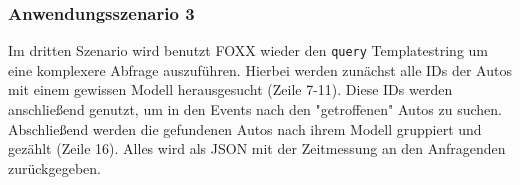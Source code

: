 \subsubsection{Anwendungsszenario 3}
Im dritten Szenario wird benutzt FOXX wieder den \texttt{query} Templatestring um eine komplexere Abfrage auszuführen. Hierbei werden zunächst alle IDs der Autos mit einem gewissen Modell herausgesucht (Zeile 7-11). Diese IDs werden anschließend genutzt, um in den Events nach den "getroffenen" Autos zu suchen. Abschließend werden die gefundenen Autos nach ihrem Modell gruppiert und gezählt (Zeile 16). Alles wird als \ac{JSON} mit der Zeitmessung an den Anfragenden zurückgegeben.
